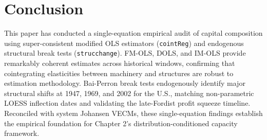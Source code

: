 \documentclass[11pt,a4paper]{article}
\begin{document}
\FloatBarrier
\section{Conclusion}

This paper has conducted a single-equation empirical audit of capital composition using super-consistent modified OLS estimators (\texttt{cointReg}) and endogenous structural break tests (\texttt{strucchange}). FM-OLS, DOLS, and IM-OLS provide remarkably coherent estimates across historical windows, confirming that cointegrating elasticities between machinery and structures are robust to estimation methodology. Bai-Perron break tests endogenously identify major structural shifts at 1947, 1969, and 2002 for the U.S., matching non-parametric LOESS inflection dates and validating the late-Fordist profit squeeze timeline. Reconciled with system Johansen VECMs, these single-equation findings establish the empirical foundation for Chapter 2's distribution-conditioned capacity framework.
\end{document}

